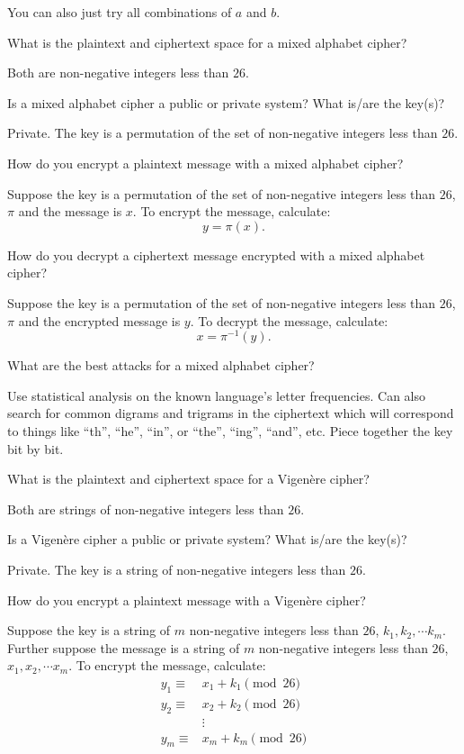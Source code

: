 \documentclass{article}
\newcounter{qcounter}
\newcommand{\showqcounter}{\theqcounter}
\newcommand{\question}{\vspace{5mm}\addtocounter{qcounter}{1}\vspace{5mm}{\bf Q\showqcounter: }}
\newcommand{\answer}{\vspace{5mm}{\bf A\showqcounter: }}
\begin{document}
  You can also just try all combinations of $a$ and $b$.

\question What is the plaintext and ciphertext space for a mixed alphabet cipher?

\answer Both are non-negative integers less than $26$.


\question Is a mixed alphabet cipher a public or private system? What is/are the key(s)?

\answer Private. The key is a permutation of the set of non-negative integers less than $26$.


\question How do you encrypt a plaintext message with a mixed alphabet cipher?

\answer Suppose the key is a permutation of the set of non-negative integers less than $26$, $\pi$ and the message is $x$.
  To encrypt the message, calculate:
  $$
    y = \pi(x).
  $$


\question How do you decrypt a ciphertext message encrypted with a mixed alphabet cipher?

\answer Suppose the key is a permutation of the set of non-negative integers less than $26$, $\pi$ and the encrypted message is $y$.
To decrypt the message, calculate:
$$
  x = \pi^{-1}(y).
$$


\question What are the best attacks for a mixed alphabet cipher?

\answer Use statistical analysis on the known language's letter frequencies. Can also search for common digrams and trigrams 
  in the ciphertext which will correspond to things like ``th'', ``he'', ``in'', or ``the'', ``ing'', ``and'', etc. 
  Piece together the key bit by bit.


\question What is the plaintext and ciphertext space for a Vigen\`ere cipher?

\answer Both are strings of non-negative integers less than $26$.


\question Is a Vigen\`ere cipher a public or private system? What is/are the key(s)?

\answer Private. The key is a string of non-negative integers less than $26$.


\question How do you encrypt a plaintext message with a Vigen\`ere cipher?

\answer Suppose the key is a string of $m$ non-negative integers less than $26$, $k_1, k_2, \cdots k_m$.
  Further suppose the message is a string of $m$ non-negative integers less than $26$, $x_1, x_2, \cdots x_m$.
  To encrypt the message, calculate:
  \begin{align*}
    y_1 \equiv& x_1 + k_1 \pmod{26}\\
    y_2 \equiv& x_2 + k_2 \pmod{26}\\
              &\vdots\\
    y_m \equiv& x_m + k_m \pmod{26}
  \end{align*}
\end{document}
